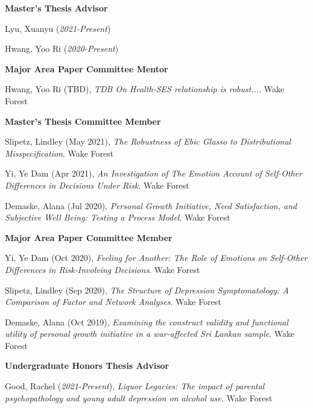{\large\textbf{Master's Thesis Advisor}}
\begin{etaremune}%
\item Lyu, Xuanyu  (\textit{2021-Present})
\item Hwang, Yoo Ri (\textit{2020-Present})
\end{etaremune}%


{\large\textbf{Major Area Paper Committee Mentor}}
\begin{etaremune}%

\item Hwang, Yoo Ri (TBD), \textit{TDB On Health-SES relationship is robust...}. Wake Forest%
\end{etaremune}%
%
{\large\textbf{Master's Thesis Committee Member}}
\begin{etaremune}%
\item  Slipetz, Lindley (May 2021), \textit{The Robustness of Ebic Glasso to Distributional Misspecification}. Wake Forest
\item Yi, Ye Dam (Apr 2021), \textit{An Investigation of The Emotion Account of Self-Other Differences in Decisions Under Risk}. Wake Forest
\item Demaske, Alana (Jul 2020), \textit{Personal Growth Initiative, Need Satisfaction, and Subjective Well Being: Testing a Process Model}. Wake Forest%
\end{etaremune}%
%



{\large\textbf{Major Area Paper Committee Member}}
\begin{etaremune}%

\item Yi, Ye Dam (Oct 2020), \textit{Feeling for Another: The Role of Emotions on Self-Other Differences in Risk-Involving Decisions}. Wake Forest%
\item Slipetz, Lindley (Sep 2020), \textit{The Structure of Depression Symptomatology: A Comparison of Factor and Network Analyses}. Wake Forest%
\item Demaske, Alana (Oct 2019), \textit{Examining the construct validity and functional utility of personal growth initiative in a war-affected Sri Lankan sample}. Wake Forest%
\end{etaremune}%
%
{\large\textbf{Undergraduate Honors Thesis Advisor}}
\begin{etaremune}%
\item Good, Rachel (\textit{2021-Present}), \textit{Liquor Legacies: The impact of parental psychopathology and young adult depression on alcohol use.} Wake Forest%
\end{etaremune}%

